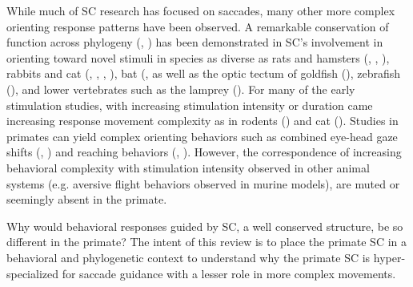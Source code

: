 \documentclass{ar-1col}
\begin{document}
While much of SC research has focused on saccades, many other more complex orienting response patterns have been observed. A remarkable conservation of function across phylogeny (\cite{sparks1988neural}, \cite{kaas1997topographic}) has been demonstrated in SC's involvement in orienting toward novel stimuli in species as diverse as rats and hamsters (\cite{mchaffie1982eye}, \cite{mort1980role}, \cite{goodale1975effects}), rabbits and cat (\cite{schaefer1970unit}, \cite{harris1980superior}, \cite{roucoux1980stimulation}, \cite{munoz1989fixation}), bat (\cite{valentine2002orienting}, as well as the optic tectum of goldfish (\cite{herrero1998tail}), zebrafish (\cite{bianco2015visuomotor}), and lower vertebrates such as the lamprey (\cite{saitoh2007tectal}). For many of the early stimulation studies, with increasing stimulation intensity or duration came increasing response movement complexity as in rodents (\cite{dean1989event}) and cat (\cite{harris1980superior}). Studies in primates can yield complex orienting behaviors such as combined eye-head gaze shifts (\cite{cowie1994subcortical}, \cite{freedman1996combined}) and reaching behaviors (\cite{werner1993neurons}, \cite{stuphorn2000neurons}). However, the correspondence of increasing behavioral complexity with stimulation intensity observed in other animal systems (e.g. aversive flight behaviors observed in murine models), are muted or seemingly absent in the primate.    

Why would behavioral responses guided by SC, a well conserved structure, be so different in the primate? The intent of this review is to place the primate SC in a behavioral and phylogenetic context to understand why the primate SC is hyper-specialized for saccade guidance with a lesser role in more complex movements.



\end{document}
